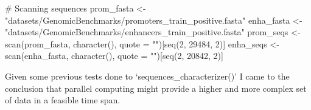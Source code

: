\documentclass[
  letterpaper,
  DIV=11,
  numbers=noendperiod]{scrartcl}
\newenvironment{Shaded}{\begin{snugshade}}{\end{snugshade}}
\newcommand{\AttributeTok}[1]{\textcolor[rgb]{0.40,0.45,0.13}{#1}}
\newcommand{\CommentTok}[1]{\textcolor[rgb]{0.37,0.37,0.37}{#1}}
\newcommand{\DecValTok}[1]{\textcolor[rgb]{0.68,0.00,0.00}{#1}}
\newcommand{\FunctionTok}[1]{\textcolor[rgb]{0.28,0.35,0.67}{#1}}
\newcommand{\NormalTok}[1]{\textcolor[rgb]{0.00,0.23,0.31}{#1}}
\newcommand{\OtherTok}[1]{\textcolor[rgb]{0.00,0.23,0.31}{#1}}
\newcommand{\StringTok}[1]{\textcolor[rgb]{0.13,0.47,0.30}{#1}}
\begin{document}
\begin{Shaded}
\begin{Highlighting}[]
\CommentTok{\# Scanning sequences}
\NormalTok{prom\_fasta }\OtherTok{\textless{}{-}} \StringTok{"datasets/GenomicBenchmarks/promoters\_train\_positive.fasta"}
\NormalTok{enha\_fasta }\OtherTok{\textless{}{-}} \StringTok{"datasets/GenomicBenchmarks/enhancers\_train\_positive.fasta"}
\NormalTok{prom\_seqs }\OtherTok{\textless{}{-}} \FunctionTok{scan}\NormalTok{(prom\_fasta, }\FunctionTok{character}\NormalTok{(), }\AttributeTok{quote =} \StringTok{""}\NormalTok{)[}\FunctionTok{seq}\NormalTok{(}\DecValTok{2}\NormalTok{, }\DecValTok{29484}\NormalTok{, }\DecValTok{2}\NormalTok{)]}
\NormalTok{enha\_seqs }\OtherTok{\textless{}{-}} \FunctionTok{scan}\NormalTok{(enha\_fasta, }\FunctionTok{character}\NormalTok{(), }\AttributeTok{quote =} \StringTok{""}\NormalTok{)[}\FunctionTok{seq}\NormalTok{(}\DecValTok{2}\NormalTok{, }\DecValTok{20842}\NormalTok{, }\DecValTok{2}\NormalTok{)]}
\end{Highlighting}
\end{Shaded}

Given some previous tests done to `sequences\_characterizer()' I came to
the conclusion that parallel computing might provide a higher and more
complex set of data in a feasible time span.
\end{document}
